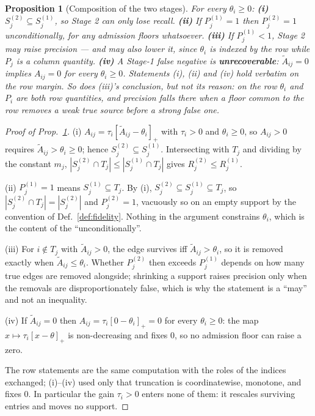 \documentclass{article}
\newtheorem{proposition}{Proposition}
\begin{document}
\begin{proposition}[Composition of the two stages]
\label{prop:stagecomp}
For every $\theta_i \ge 0$: \textbf{(i)} $S_j^{(2)}\subseteq S_j^{(1)}$, so Stage 2 can only lose
recall. \textbf{(ii)} If $P_j^{(1)}=1$ then $P_j^{(2)}=1$ \emph{unconditionally}, for any
admission floors whatsoever. \textbf{(iii)} If $P_j^{(1)}<1$, Stage 2 may raise precision ---
and may also lower it, since $\theta_i$ is indexed by the row while $P_j$ is a column quantity.
\textbf{(iv)} A Stage-1 false negative is \textbf{unrecoverable}: $\tilde A_{ij}=0$ implies
$A_{ij}=0$ for every $\theta_i\ge0$. Statements (i), (ii) and (iv) hold verbatim on the row
margin. So does (iii)'s conclusion, but not its reason: on the row $\theta_i$ and $P_i$ are both
row quantities, and precision falls there when a floor common to the row removes a weak true
source before a strong false one.
\end{proposition}

\begin{proof}[Proof of Prop.~\ref{prop:stagecomp}]
(i) $A_{ij} = \tau_i[\tilde A_{ij} - \theta_i]_+$ with $\tau_i>0$ and $\theta_i \geq 0$, so
$A_{ij} > 0$ requires $\tilde A_{ij} > \theta_i \geq 0$; hence
$S_j^{(2)} \subseteq S_j^{(1)}$. Intersecting with $T_j$ and dividing by the constant $m_j$,
$|S_j^{(2)} \cap T_j| \leq |S_j^{(1)} \cap T_j|$ gives $R_j^{(2)} \leq R_j^{(1)}$.

(ii) $P_j^{(1)} = 1$ means $S_j^{(1)} \subseteq T_j$. By (i),
$S_j^{(2)} \subseteq S_j^{(1)} \subseteq T_j$, so $|S_j^{(2)} \cap T_j| = |S_j^{(2)}|$ and
$P_j^{(2)} = 1$, vacuously so on an empty support by the convention of
Def.~\ref{def:fidelity}. Nothing in the argument constrains
$\theta_i$, which is the content of the ``unconditionally''.

(iii) For $i \notin T_j$ with $\tilde A_{ij} > 0$, the edge survives iff
$\tilde A_{ij} > \theta_i$, so it is removed exactly when $\tilde A_{ij} \leq \theta_i$.
Whether $P_j^{(2)}$ then exceeds $P_j^{(1)}$ depends on how many true edges are removed
alongside; shrinking a support raises precision only when the removals are disproportionately
false, which is why the statement is a ``may'' and not an inequality.

(iv) If $\tilde A_{ij} = 0$ then $A_{ij} = \tau_i[0 - \theta_i]_+ = 0$ for every
$\theta_i \geq 0$: the map $x \mapsto \tau_i[x-\theta]_+$ is non-decreasing and fixes $0$, so no
admission floor can raise a zero.

The row statements are the same computation with the roles of the indices exchanged; (i)--(iv)
used only that truncation is coordinatewise, monotone, and fixes $0$. In particular the gain
$\tau_i>0$ enters none of them: it rescales surviving entries and moves no support.
\end{proof}
\end{document}
